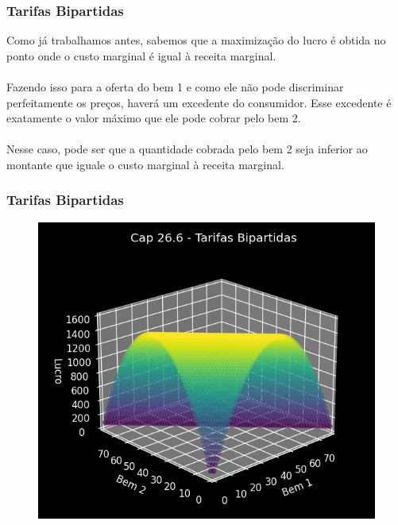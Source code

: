 \documentclass{beamer}[10]
\begin{document}
\begin{frame}
	\frametitle{Tarifas Bipartidas}

	Como já trabalhamos antes, sabemos que a maximização do lucro é obtida no ponto onde o custo marginal é igual à receita marginal. 
	\\~\\
	Fazendo isso para a oferta do bem 1 e como ele não pode discriminar perfeitamente os preços, haverá um excedente do consumidor. Esse excedente é exatamente o valor máximo que ele pode cobrar pelo bem 2. 
	\\~\\
	Nesse caso, pode ser que a quantidade cobrada pelo bem 2 seja inferior ao montante que iguale o custo marginal à receita marginal.
\end{frame}

\begin{frame}
	\frametitle{Tarifas Bipartidas}

	\begin{figure}[H]
		\centering
		\includegraphics[scale=0.7]{cap26_6-tarifas_bipartidas3.png}
	\end{figure}

\end{frame}

\end{document}
